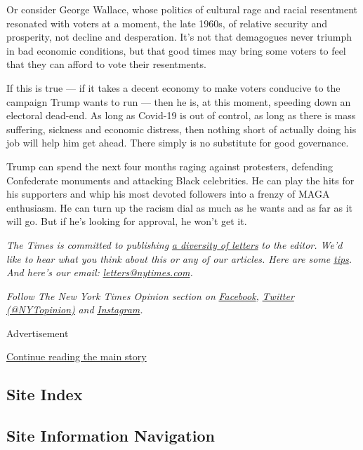 Or consider George Wallace, whose politics of cultural rage and racial
resentment resonated with voters at a moment, the late 1960s, of
relative security and prosperity, not decline and desperation. It's not
that demagogues never triumph in bad economic conditions, but that good
times may bring some voters to feel that they can afford to vote their
resentments.

If this is true --- if it takes a decent economy to make voters
conducive to the campaign Trump wants to run --- then he is, at this
moment, speeding down an electoral dead-end. As long as Covid-19 is out
of control, as long as there is mass suffering, sickness and economic
distress, then nothing short of actually doing his job will help him get
ahead. There simply is no substitute for good governance.

Trump can spend the next four months raging against protesters,
defending Confederate monuments and attacking Black celebrities. He can
play the hits for his supporters and whip his most devoted followers
into a frenzy of MAGA enthusiasm. He can turn up the racism dial as much
as he wants and as far as it will go. But if he's looking for approval,
he won't get it.

\emph{The Times is committed to publishing}
\href{https://www.nytimes.com/2019/01/31/opinion/letters/letters-to-editor-new-york-times-women.html}{\emph{a
diversity of letters}} \emph{to the editor. We'd like to hear what you
think about this or any of our articles. Here are some}
\href{https://help.nytimes.com/hc/en-us/articles/115014925288-How-to-submit-a-letter-to-the-editor}{\emph{tips}}\emph{.
And here's our email:}
\href{mailto:letters@nytimes.com}{\emph{letters@nytimes.com}}\emph{.}

\emph{Follow The New York Times Opinion section on}
\href{https://www.facebook.com/nytopinion}{\emph{Facebook}}\emph{,}
\href{http://twitter.com/NYTOpinion}{\emph{Twitter (@NYTopinion)}}
\emph{and}
\href{https://www.instagram.com/nytopinion/}{\emph{Instagram}}\emph{.}

Advertisement

\protect\hyperlink{after-bottom}{Continue reading the main story}

\hypertarget{site-index}{%
\subsection{Site Index}\label{site-index}}

\hypertarget{site-information-navigation}{%
\subsection{Site Information
Navigation}\label{site-information-navigation}}

